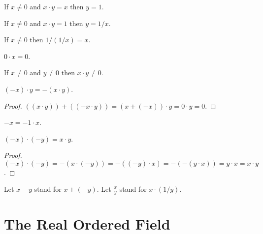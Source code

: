 \documentclass{article}
\begin{document}
\begin{forthel}
\begin{proposition}[1 15 b] If $x \neq 0$ and $x \cdot y = x$ then $y = 1$.
\end{proposition}
\begin{proposition}[1 15 c] If $x \neq 0$ and $x \cdot y = 1$ then $y = 1/x$.
\end{proposition}

\begin{proposition}[1 15 d] If $x \neq 0$ then $1/(1/x) = x$.
\end{proposition}

\begin{proposition}[1 16 a] $0 \cdot x = 0$. \end{proposition}
\begin{proposition}[1 16 b] If $x \neq 0$ and $y \neq 0$ then $x \cdot y \neq 0$.
\end{proposition}
\begin{proposition}[1 16 c] $(-x) \cdot y = -(x \cdot y)$. \end{proposition}
\begin{proof} $((x \cdot y)) + ((-x \cdot y)) = (x + (-x)) \cdot y 
= 0 \cdot y = 0$.
\end{proof}

\begin{proposition} $-x = -1 \cdot x$. \end{proposition}

\begin{proposition}[1 16d] $(-x) \cdot (-y) = x \cdot y$.
\end{proposition}
\begin{proof} $(-x)\cdot (-y)=-(x\cdot(-y))=-((-y)\cdot x)=
-(-(y\cdot x))=y\cdot x=x\cdot y$. 
\end{proof}

Let $x - y$ stand for $x + (-y)$.
Let $\frac{x}{y}$ stand for $x \cdot (1/y)$.

\end{forthel}

\section{The Real Ordered Field}
\end{document}
